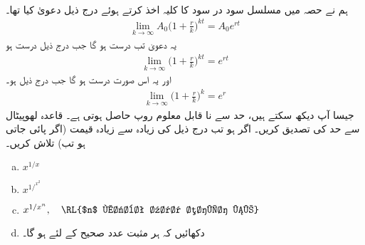 \\
ہم نے حصہ  میں مسلسل سود در سود کا کلیہ  اخذ کرتے ہوئے  درج ذیل دعویٰ کیا تھا۔ 
\begin{align*}
\lim_{k\to \infty}A_0\big(1+\frac{r}{k}\big)^{kt}=A_0e^{rt}
\end{align*}
یہ دعویٰ تب درست ہو گا جب درج ذیل درست ہو
\begin{align*}
\lim_{k\to \infty}\big(1+\frac{r}{k}\big)^{kt}=e^{rt}
\end{align*}
اور یہ اس صورت درست ہو گا جب درج ذیل ہو۔
\begin{align*}
\lim_{k\to \infty}\big(1+\frac{r}{k}\big)^k=e^r
\end{align*}
جیسا آپ دیکھ سکتے ہیں، حد سے نا قابل معلوم روپ  حاصل ہوتی ہے۔ قاعدہ لھوپیٹال سے حد کی تصدیق کریں۔
اگر  ہو تب درج ذیل کی زیادہ سے زیادہ قیمت  (اگر پائی جاتی ہو تب) تلاش کریں۔
\begin{enumerate}[a.]
\item
$x^{1/x}$
\item
$x^{1/^{x^2}}$
\item
$x^{1/{x^n}},\quad \text{\RL{$n$ مثبت عدد صحیح ہے}}$
\item
دکھائیں کہ ہر مثبت عدد صحیح  کے لئے  ہو گا۔
\end{enumerate}

